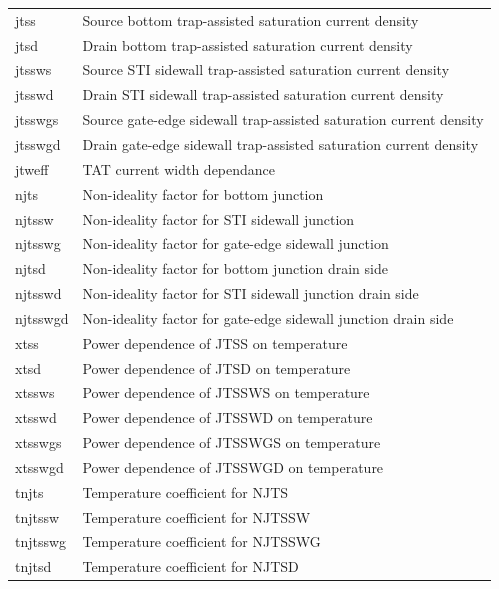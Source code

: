 \begin{longtable}{l l}
{\small jtss} & {\small Source bottom trap-assisted saturation current density} \\
{\small jtsd} & {\small Drain bottom trap-assisted saturation current density} \\
{\small jtssws} & {\small Source STI sidewall trap-assisted saturation current density} \\
{\small jtsswd} & {\small Drain STI sidewall trap-assisted saturation current density} \\
{\small jtsswgs} & {\small Source gate-edge sidewall trap-assisted saturation current density} \\
{\small jtsswgd} & {\small Drain gate-edge sidewall trap-assisted saturation current density} \\
{\small jtweff} & {\small TAT current width dependance} \\
{\small njts} & {\small Non-ideality factor for bottom junction} \\
{\small njtssw} & {\small Non-ideality factor for STI sidewall junction} \\
{\small njtsswg} & {\small Non-ideality factor for gate-edge sidewall junction} \\
{\small njtsd} & {\small Non-ideality factor for bottom junction drain side} \\
{\small njtsswd} & {\small Non-ideality factor for STI sidewall junction drain side} \\
{\small njtsswgd} & {\small Non-ideality factor for gate-edge sidewall junction drain side} \\
{\small xtss} & {\small Power dependence of JTSS on temperature} \\
{\small xtsd} & {\small Power dependence of JTSD on temperature} \\
{\small xtssws} & {\small Power dependence of JTSSWS on temperature} \\
{\small xtsswd} & {\small Power dependence of JTSSWD on temperature} \\
{\small xtsswgs} & {\small Power dependence of JTSSWGS on temperature} \\
{\small xtsswgd} & {\small Power dependence of JTSSWGD on temperature} \\
{\small tnjts} & {\small Temperature coefficient for NJTS} \\
{\small tnjtssw} & {\small Temperature coefficient for NJTSSW} \\
{\small tnjtsswg} & {\small Temperature coefficient for NJTSSWG} \\
{\small tnjtsd} & {\small Temperature coefficient for NJTSD} \\

\end{longtable}
